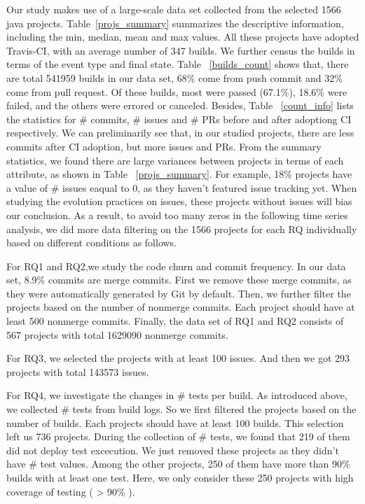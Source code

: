 Our study makes use of a large-scale data set collected from the selected 1566 java projects. Table~\ref{projs_summary} summarizes the descriptive information, including the min, median, mean and max values. All these projects have adopted Travis-CI, with an average number of 347 builds. We further census the builds in terms of the event type and final state. Table ~\ref{builds_count} shows that, there are total 541959 builds in our data set, 68\% come from push commit and 32\% come from pull request. Of these builds, most were passed (67.1\%), 18.6\% were failed, and the others were errored or canceled. Besides, Table ~\ref{count_info} lists the statistics for \# commits, \# issues and \# PRs before and after adoptiong CI respectively. We can preliminarily see that, in our studied projects, there are less commits after CI adoption, but more issues and PRs. From the summary statistics, we found there are large variances between projects in terms of each attribute, as shown in Table ~\ref{projs_summary}. For example, 18\% projects have a value of \# issues eaqual to 0, as they haven't featured issue tracking yet. When studying the evolution practices on issues, these projects without issues will bias our conclusion. As a result, to avoid too many zeros in the following time series analysis, we did more data filtering on the 1566 projects for each RQ individually based on different conditions as follows.

For RQ1 and RQ2,we study the code churn and commit frequency. In our data set, 8.9\% commits are merge commits. First we remove these merge commits, as they were automatically generated by Git by default. Then, we further filter the projects based on the number of nonmerge commits. Each project should have at least 500 nonmerge commits. Finally, the data set of RQ1 and RQ2 consists of 567 projects with total 1629090 nonmerge commits.

For RQ3, we selected the projects with at least 100 issues. And then we got 293 projects with total 143573 issues.

For RQ4,  we investigate the changes in \# tests per build.
As introduced above, we collected \# tests from build logs. So we first filtered the projects based on the number of builds. Each projects should have at least 100 builds. This selection left us 736 projects. 
During the collection of \# tests, we found that 219 of them did not deploy test excecution. We just removed these projects as they didn't have \# test values. Among the other projects, 250 of them have more than 90\% builds with at least one test. Here, we only consider these 250 projects with high coverage of testing ( \textgreater{ 90\%} ).

